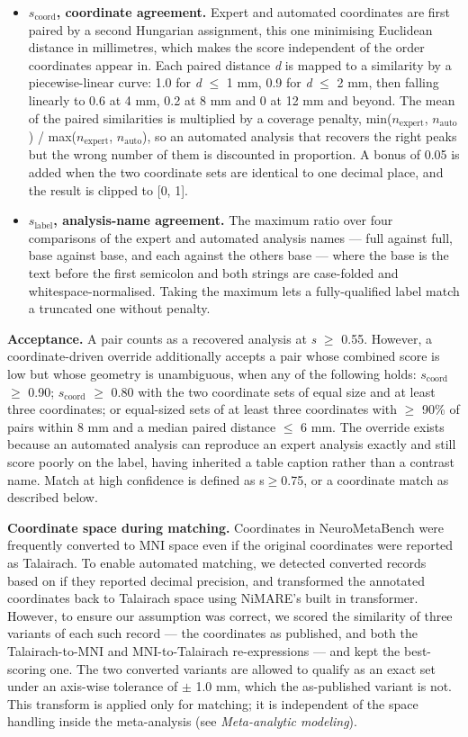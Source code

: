 \begin{itemize}
\item
  \textbf{$s_{\mathrm{coord}}$, coordinate agreement.} Expert and automated coordinates are first paired by a second Hungarian assignment, this one minimising Euclidean distance in millimetres, which makes the score independent of the order coordinates appear in. Each paired distance \emph{d} is mapped to a similarity by a piecewise-linear curve: 1.0 for \emph{d} $\leq$ 1 mm, 0.9 for \emph{d} $\leq$ 2 mm, then falling linearly to 0.6 at 4 mm, 0.2 at 8 mm and 0 at 12 mm and beyond. The mean of the paired similarities is multiplied by a coverage penalty, min($n_{\mathrm{expert}}$, $n_{\mathrm{auto}}$) / max($n_{\mathrm{expert}}$, $n_{\mathrm{auto}}$), so an automated analysis that recovers the right peaks but the wrong number of them is discounted in proportion. A bonus of 0.05 is added when the two coordinate sets are identical to one decimal place, and the result is clipped to {[}0, 1{]}.
\item
  \textbf{$s_{\mathrm{label}}$, analysis-name agreement.} The maximum ratio over four comparisons of the expert and automated analysis names --- full against full, base against base, and each against the other\textquotesingle s base --- where the base is the text before the first semicolon and both strings are case-folded and whitespace-normalised. Taking the maximum lets a fully-qualified label match a truncated one without penalty.
\end{itemize}

\textbf{Acceptance.} A pair counts as a recovered analysis at \emph{s} $\geq$ 0.55. However, a coordinate-driven override additionally accepts a pair whose combined score is low but whose geometry is unambiguous, when any of the following holds: $s_{\mathrm{coord}}$ $\geq$ 0.90; $s_{\mathrm{coord}}$ $\geq$ 0.80 with the two coordinate sets of equal size and at least three coordinates; or equal-sized sets of at least three coordinates with $\geq$ 90\% of pairs within 8 mm and a median paired distance $\leq$ 6 mm. The override exists because an automated analysis can reproduce an expert analysis exactly and still score poorly on the label, having inherited a table caption rather than a contrast name. Match at high confidence is defined as s$\geq$0.75, or a coordinate match as described below.

\textbf{Coordinate space during matching.} Coordinates in NeuroMetaBench were frequently converted to MNI space even if the original coordinates were reported as Talairach. To enable automated matching, we detected converted records based on if they reported decimal precision, and transformed the annotated coordinates back to Talairach space using NiMARE's built in transformer. However, to ensure our assumption was correct, we scored the similarity of three variants of each such record --- the coordinates as published, and both the Talairach-to-MNI and MNI-to-Talairach re-expressions --- and kept the best-scoring one. The two converted variants are allowed to qualify as an exact set under an axis-wise tolerance of $\pm$ 1.0 mm, which the as-published variant is not. This transform is applied only for matching; it is independent of the space handling inside the meta-analysis (see \emph{Meta-analytic modeling}).


